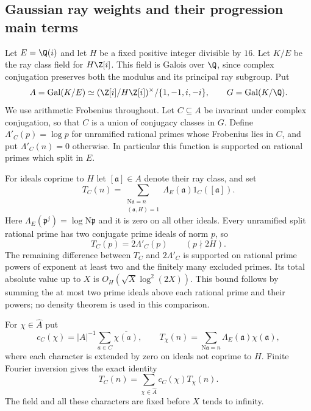 \subsection{Gaussian ray weights and their progression main terms}
\label{subsec:gaussian-progression-mainterms}

Let $E=\Q(i)$ and let $H$ be a fixed positive integer divisible by $16$.
Let $K/E$ be the ray class field for $H\Z[i]$.  This field is Galois over
$\Q$, since complex conjugation preserves both the modulus and its
principal ray subgroup.  Put
\[
 A=\operatorname{Gal}(K/E)
   \simeq (\Z[i]/H\Z[i])^\times/\{1,-1,i,-i\},
 \qquad G=\operatorname{Gal}(K/\Q).
\]
We use arithmetic Frobenius throughout.  Let $C\subseteq A$ be invariant
under complex conjugation, so that $C$ is a union of conjugacy classes in
$G$.  Define $\Lambda'_C(p)=\log p$ for unramified rational primes whose
Frobenius lies in $C$, and put $\Lambda'_C(n)=0$ otherwise.  In particular
this function is supported on rational primes which split in $E$.

For ideals coprime to $H$ let $[\mathfrak a]\in A$ denote their ray class,
and set
\[
 T_C(n)=\sum_{\substack{\mathrm N\mathfrak a=n\\(\mathfrak a,H)=1}}
       \Lambda_E(\mathfrak a)1_C([\mathfrak a]).
\]
Here $\Lambda_E(\mathfrak p^j)=\log\mathrm N\mathfrak p$ and it is zero
on all other ideals.  Every unramified split rational prime has two
conjugate prime ideals of norm $p$, so
\begin{equation}\label{eq:gaussian-ray-prime-factor}
 T_C(p)=2\Lambda'_C(p)\qquad(p\nmid2H).
\end{equation}
The remaining difference between $T_C$ and $2\Lambda'_C$ is supported on
rational prime powers of exponent at least two and the finitely many
excluded primes.  Its total absolute value up to $X$ is
$O_H(\sqrt X\log^2(2X))$.  This bound follows by summing the at most two
prime ideals above each rational prime and their powers; no density
theorem is used in this comparison.

For $\chi\in\widehat A$ put
\[
 c_C(\chi)=|A|^{-1}\sum_{a\in C}\overline{\chi(a)},\qquad
 T_\chi(n)=\sum_{\mathrm N\mathfrak a=n}
                  \Lambda_E(\mathfrak a)\chi(\mathfrak a),
\]
where each character is extended by zero on ideals not coprime to $H$.
Finite Fourier inversion gives the exact identity
\begin{equation}\label{eq:gaussian-ray-fourier}
                 T_C(n)=\sum_{\chi\in\widehat A}c_C(\chi)T_\chi(n).
\end{equation}
The field and all these characters are fixed before $X$ tends to infinity.

